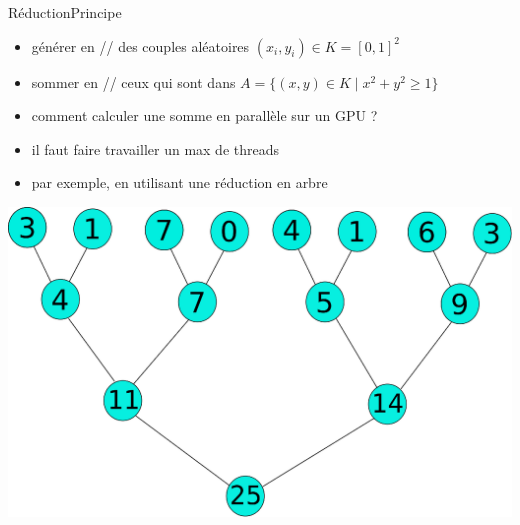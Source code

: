 \documentclass[11pt,mathserif]{beamer}
\newcommand{\scout}{\faAngellist}
\newcommand{\galde}{\faQuestion}
\newcommand{\argi}{\faLightbulbO}
\newcommand{\kontuz}{\faExclamationTriangle}
\newcommand{\harritu}{\faExclamation}
\begin{document}
\begin{frame}{Réduction}{Principe}
 \begin{itemize}[<+->]
   \item[\argi] générer en // des couples aléatoires $(x_i,y_i) \in K = [0,1]^2$
   \item[\argi] sommer en // ceux qui sont dans $A = \{ (x,y) \in K \;|\; x^2+y^2 \geqslant 1 \}$
   \item[\galde] comment calculer une somme en parallèle sur un GPU ?
   \item[\kontuz] il faut faire travailler un max de threads \harritu
   \item[\scout] par exemple, en utilisant une réduction en arbre 
  \end{itemize}
\pause
\begin{center}
  \includegraphics[width=0.6\linewidth]{fig/zuhaitz.eps}
\end{center}
\end{frame}
\end{document}
